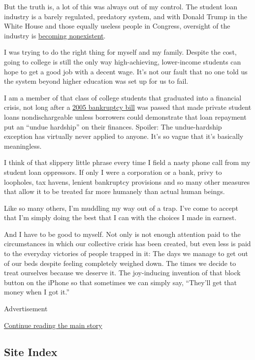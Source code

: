 But the truth is, a lot of this was always out of my control. The
student loan industry is a barely regulated, predatory system, and with
Donald Trump in the White House and those equally useless people in
Congress, oversight of the industry is
\href{http://www.latimes.com/business/la-fi-cfpb-overhaul-20180205-story.html}{becoming
nonexistent}.

I was trying to do the right thing for myself and my family. Despite the
cost, going to college is still the only way high-achieving,
lower-income students can hope to get a good job with a decent wage.
It's not our fault that no one told us the system beyond higher
education was set up for us to fail.

I am a member of that class of college students that graduated into a
financial crisis, not long after a
\href{http://www.slate.com/blogs/moneybox/2015/04/16/student_loans_in_bankruptcy_how_the_bush_administration_pointlessly_screwed.html}{2005
bankruptcy bill} was passed that made private student loans
nondischargeable unless borrowers could demonstrate that loan repayment
put an ``undue hardship'' on their finances. Spoiler: The undue-hardship
exception has virtually never applied to anyone. It's so vague that it's
basically meaningless.

I think of that slippery little phrase every time I field a nasty phone
call from my student loan oppressors. If only I were a corporation or a
bank, privy to loopholes, tax havens, lenient bankruptcy provisions and
so many other measures that allow it to be treated far more humanely
than actual human beings.

Like so many others, I'm muddling my way out of a trap. I've come to
accept that I'm simply doing the best that I can with the choices I made
in earnest.

And I have to be good to myself. Not only is not enough attention paid
to the circumstances in which our collective crisis has been created,
but even less is paid to the everyday victories of people trapped in it:
The days we manage to get out of our beds despite feeling completely
weighed down. The times we decide to treat ourselves because we deserve
it. The joy-inducing invention of that block button on the iPhone so
that sometimes we can simply say, ``They'll get that money when I got
it.''

Advertisement

\protect\hyperlink{after-bottom}{Continue reading the main story}

\hypertarget{site-index}{%
\subsection{Site Index}\label{site-index}}

